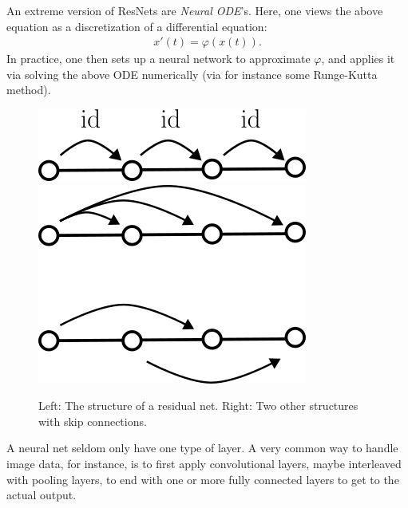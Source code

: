 \documentclass{article}
\begin{document}
An extreme version of ResNets are \emph{Neural ODE}'s. Here, one views the above equation as a discretization of a differential equation:
\begin{align*}    x'(t)=\varphi(x(t)).
\end{align*}
In practice, one then sets up a neural network to approximate $\varphi$, and applies it via solving the above ODE numerically (via for instance some Runge-Kutta method).
\newline 

\begin{figure}
    \centering
    \includegraphics[width=0.45\linewidth]{graphics/resnet.png}\includegraphics[width=0.45\linewidth]{graphics/skip_connections.png}
    \caption{Left: The structure of a residual net. Right: Two other structures with skip connections.}
    \label{fig:skip_con}
\end{figure}

A neural net seldom only have one type of layer. A very common way to handle image data, for instance, is to first apply convolutional layers, maybe interleaved with pooling layers, to end with one or more fully connected layers to get to the actual output.





\end{document}

